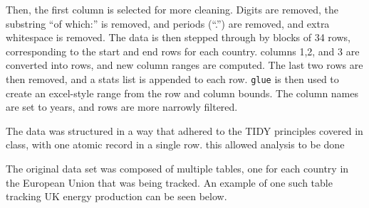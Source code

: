 \documentclass[
  letterpaper,
  DIV=11,
  numbers=noendperiod]{scrartcl}
\begin{document}
Then, the first column is selected for more cleaning. Digits are
removed, the substring ``of which:'' is removed, and periods (``.'') are
removed, and extra whitespace is removed. The data is then stepped
through by blocks of 34 rows, corresponding to the start and end rows
for each country. columns 1,2, and 3 are converted into rows, and new
column ranges are computed. The last two rows are then removed, and a
stats list is appended to each row. \texttt{glue} is then used to create
an excel-style range from the row and column bounds. The column names
are set to years, and rows are more narrowly filtered.

The data was structured in a way that adhered to the TIDY principles
covered in class, with one atomic record in a single row. this allowed
analysis to be done

The original data set was composed of multiple tables, one for each
country in the European Union that was being tracked. An example of one
such table tracking UK energy production can be seen below.
\end{document}
